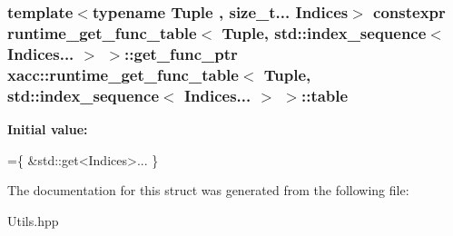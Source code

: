 \subsubsection[{\texorpdfstring{table}{table}}]{\setlength{\rightskip}{0pt plus 5cm}template$<$typename Tuple , size\+\_\+t... Indices$>$ constexpr {\bf runtime\+\_\+get\+\_\+func\+\_\+table}$<$ Tuple, std\+::index\+\_\+sequence$<$ Indices... $>$ $>$\+::get\+\_\+func\+\_\+ptr {\bf xacc\+::runtime\+\_\+get\+\_\+func\+\_\+table}$<$ Tuple, std\+::index\+\_\+sequence$<$ Indices... $>$ $>$\+::table\hspace{0.3cm}{\ttfamily [static]}}\hypertarget{a00059_a80921470cc04db92bab9127ae768d759}{}\label{a00059_a80921470cc04db92bab9127ae768d759}
{\bfseries Initial value\+:}
\begin{DoxyCode}
=\{
        &std::get<Indices>...
    \}
\end{DoxyCode}


The documentation for this struct was generated from the following file\+:\begin{DoxyCompactItemize}
\item 
Utils.\+hpp\end{DoxyCompactItemize}
